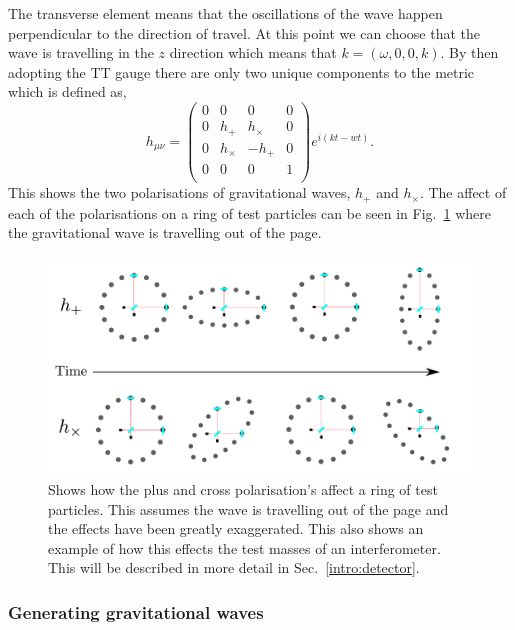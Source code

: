 The transverse element means that the oscillations of the wave happen perpendicular to the direction of travel.
At this point we can choose that the wave is travelling in the $z$ direction which means that $k = (\omega,0,0,k)$.
By then adopting the TT gauge there are only two unique components to the metric which is defined as,
\begin{equation}
h_{\mu \nu} = \left( 
\begin{matrix}
0 & 0 & 0 & 0 \\
0 & h_{+} & h_{\times} & 0 \\
0 & h_{\times} & -h_{+} & 0 \\
0 & 0 & 0 & 1 \\
\end{matrix}
\right) 
e^{i(kt - wt)}.
\end{equation}
This shows the two polarisations of gravitational waves, $h_{+}$ and $h_{\times}$.
The affect of each of the polarisations on a ring of test particles can be seen in Fig.~\ref{gw:polarisations} where the gravitational wave is travelling out of the page.

\begin{figure}[h]
    \centering
    \includegraphics[width=\textwidth]{C1_Introduction/polarisation_ring.pdf}
    \caption{Shows how the plus and cross polarisation's affect a ring of test particles. This assumes the wave is travelling out of the page and the effects have been greatly exaggerated. This also shows an example of how this effects the test masses of an interferometer. This will be described in more detail in Sec.~\ref{intro:detector}.}
    \label{gw:polarisations}
\end{figure}



\subsubsection{Generating gravitational waves}

